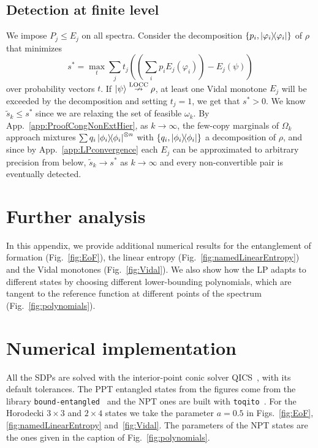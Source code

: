 \documentclass[aps,pra,twocolumn,superscriptaddress]{revtex4-2}
\begin{document}
\begin{widetext}
\subsection{Detection at finite level}
We impose $P_j\leq E_j$ on all spectra.
Consider the decomposition $\{p_i, \dyad{\varphi_i}\}$ of $\rho$ that minimizes
\begin{equation}
    s^*=\max_t \sum_j t_j \left( \left(\sum_i p_i E_j(\varphi_i)\right)  - E_j(\psi) \right)
\end{equation}
over probability vectors $t$.
If $\ket{\psi}\overset{\text{LOCC}}{\nrightarrow}\rho$, at least one Vidal monotone $E_j$ will be exceeded by the decomposition and setting $t_j=1$, we get that $s^*>0$.
We know $\widetilde{s}_k \leq s^*$ since we are relaxing the set of feasible $\omega_k$.
By App.~\ref{app:ProofCongNonExtHier}, as $k\to\infty$, the few-copy marginals of $\Omega_k$ approach mixtures $\sum q_i\dyad{\phi_i}^{\otimes n}$ with $\{q_i, \dyad{\phi_i}\}$ a decomposition of $\rho$, and since by App.~\ref{app:LPconvergence} each $E_j$ can be approximated to arbitrary precision from below, $\widetilde{s}_k \to s^*$ as $k \to \infty$ and every non-convertible pair is eventually detected.

\section{Further analysis}
In this appendix, we provide additional numerical results for the entanglement of formation (Fig.~\ref{fig:EoF}), the linear entropy (Fig.~\ref{fig:namedLinearEntropy}) and the Vidal monotones (Fig.~\ref{fig:Vidal}).
We also show how the LP adapts to different states by choosing different lower-bounding polynomials, which are tangent to the reference function at different points of the spectrum (Fig.~\ref{fig:polynomials}).






\section{Numerical implementation}\label{app:numerics}
All the SDPs are solved with the interior-point conic solver QICS~\cite{qics}, with its default tolerances.
The PPT entangled states from the figures come from the library \texttt{bound-entangled}~\cite{boundEntangled} and the NPT ones are built with \texttt{toqito}~\cite{toqito}. For the Horodecki $3\times3$ and $2\times4$ states we take the parameter $a=0.5$ in Figs.~\ref{fig:EoF}, \ref{fig:namedLinearEntropy} and~\ref{fig:Vidal}. The parameters of the NPT states are the ones given in the caption of Fig.~\ref{fig:polynomials}.


\end{widetext}
\end{document}

